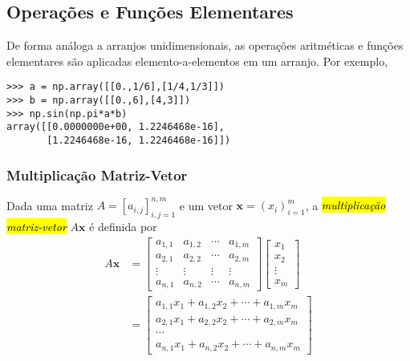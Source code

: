 \subsection{Operações e Funções Elementares}

De forma análoga a arranjos unidimensionais, as operações aritméticas e funções elementares são aplicadas elemento-a-elementos em um arranjo. Por exemplo,
\begin{lstlisting}
>>> a = np.array([[0.,1/6],[1/4,1/3]])
>>> b = np.array([[0.,6],[4,3]])
>>> np.sin(np.pi*a*b)
array([[0.0000000e+00, 1.2246468e-16],
       [1.2246468e-16, 1.2246468e-16]])
\end{lstlisting}

\subsubsection{Multiplicação Matriz-Vetor}

Dada uma matriz $A = [a_{i,j}]_{i,j=1}^{n,m}$ e um vetor $\pmb{x} = (x_i)_{i=1}^m$, a \hl{\emph{multiplicação matriz-vetor}} $A\pmb{x}$ é definida por
\begin{subequations}
  \begin{align}
    A\pmb{x} &=\begin{bmatrix}
      a_{1,1} & a_{1,2} & \cdots & a_{1,m}\\
      a_{2,1} & a_{2,2} & \cdots & a_{2,m}\\
      \vdots & \vdots & \vdots & \vdots\\
      a_{n,1} & a_{n,2} & \cdots & a_{n,m}
    \end{bmatrix}\begin{bmatrix}
      x_1\\
      x_2\\
      \vdots\\
      x_m
    \end{bmatrix}\\
    &=
      \begin{bmatrix}
        a_{1,1}x_1 + a_{1,2}x_2 + \cdots + a_{1,m}x_m\\
        a_{2,1}x_1 + a_{2,2}x_2 + \cdots + a_{2,m}x_m\\
        \cdots\\
        a_{n,1}x_1 + a_{n,2}x_2 + \cdots + a_{n,m}x_m
      \end{bmatrix}
  \end{align}
\end{subequations}

